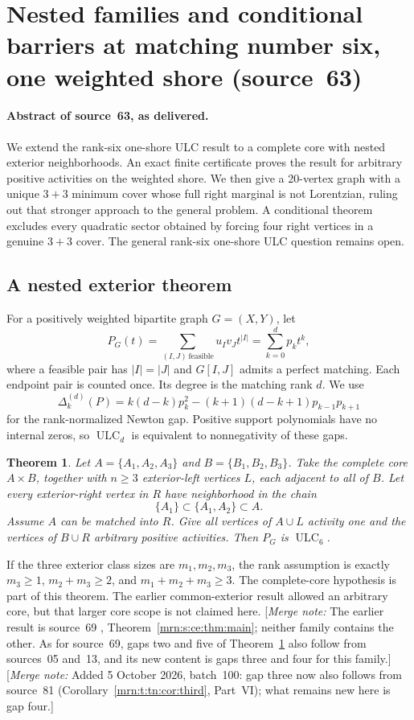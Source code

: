 \documentclass[11pt,a4paper]{article}
\newtheorem{theorem}{Theorem}[section]
\theoremstyle{remark}\newtheorem{remark}[theorem]{Remark}
\newcommand{\ULC}{\operatorname{ULC}}      %
\newcommand{\gap}{\Delta}                  %
\newcommand{\mnote}[1]{[\textit{Merge note:} #1]}
\begin{document}
\section{Nested families and conditional barriers at matching number six, one weighted shore (source~63)}\label{mrn:src:63}
\paragraph{Abstract of source~63, as delivered.} We extend the rank-six one-shore ULC result to a complete core with nested exterior neighborhoods. An exact finite certificate proves the result for arbitrary positive activities on the weighted shore. We then give a 20-vertex graph with a unique $3+3$ minimum cover whose full right marginal is not Lorentzian, ruling out that stronger approach to the general problem. A conditional theorem excludes every quadratic sector obtained by forcing four right vertices in a genuine $3+3$ cover. The general rank-six one-shore ULC question remains open.

\subsection{A nested exterior theorem}
For a positively weighted bipartite graph $G=(X,Y)$, let
\[
 P_G(t)=\sum_{(I,J)\,\mathrm{feasible}}u_Iv_Jt^{|I|}
       =\sum_{k=0}^{d}p_kt^k,
\]
where a feasible pair has $|I|=|J|$ and $G[I,J]$ admits a perfect matching. Each endpoint pair is counted once. Its degree is the matching rank $d$. We use
\[
 \gap_k^{(d)}(P)=k(d-k)p_k^2-(k+1)(d-k+1)p_{k-1}p_{k+1}
\]
for the rank-normalized Newton gap. Positive support polynomials have no internal zeros, so $\ULC_d$ is equivalent to nonnegativity of these gaps.

\begin{theorem}\label{mrn:s:ne:thm:nested}
Let $A=\{A_1,A_2,A_3\}$ and $B=\{B_1,B_2,B_3\}$. Take the complete core $A\times B$, together with $n\ge3$ exterior-left vertices $L$, each adjacent to all of $B$. Let every exterior-right vertex in $R$ have neighborhood in the chain
\[
 \{A_1\}\subset\{A_1,A_2\}\subset A.
\]
Assume $A$ can be matched into $R$. Give all vertices of $A\cup L$ activity one and the vertices of $B\cup R$ arbitrary positive activities. Then $P_G$ is $\ULC_6$.
\end{theorem}
If the three exterior class sizes are $m_1,m_2,m_3$, the rank assumption is exactly $m_3\ge1$, $m_2+m_3\ge2$, and $m_1+m_2+m_3\ge3$. The complete-core hypothesis is part of this theorem. The earlier common-exterior result allowed an arbitrary core, but that larger core scope is not claimed here. \mnote{The earlier result is source~69 \cite{b:m69}, Theorem~\ref{mrn:s:ce:thm:main}; neither family contains the other. As for source~69, gaps two and five of Theorem~\ref{mrn:s:ne:thm:nested} also follow from sources~05 and~13, and its new content is gaps three and four for this family.} \mnote{Added 5 October 2026, batch~100: gap three now also follows from source~81 (Corollary~\ref{mrn:t:tn:cor:third}, Part~VI); what remains new here is gap four.}
\end{document}
